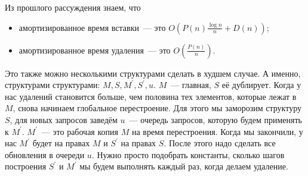 Из прошлого рассуждения знаем, что

\begin{itemize}
	\item амортизированное время вставки~--- это $O\left(P(n)\frac{\log n}{n} + D(n)\right)$;
	\item амортизированное время удаления~--- это $O\left(\frac{P(n)}{n}\right)$.
\end{itemize}

Это также можно несколькими структурами сделать в худшем случае. А именно, структурами структурами: $M,S,M^\prime,S^\prime,u$. $M$~--- главная, $S$ её дублирует. Когда у нас удалений становится больше, чем половина тех элементов, которые лежат в $M$, снова начинаем глобальное перестроение. Для этого мы заморозим структуру $S$, для новых запросов заведём $ u$~--- очередь запросов, которую будем применять к $M^\prime$. $M^\prime$~--- это рабочая копия $M$ на время перестроения. Когда мы закончили, у нас $M^\prime$ будет на правах $M$ и $S^\prime$ на правах $S$. После этого надо сделать все обновления в очереди $u$. Нужно просто подобрать константы, сколько шагов построения $S^\prime$ и $M^\prime$ мы будем выполнять каждый раз, когда делаем удаление.
